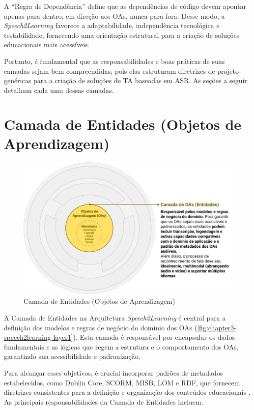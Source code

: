 A ``Regra de Dependência'' define que as dependências de código devem apontar apenas para dentro, em direção aos OAs, nunca para fora. Desse modo, a \textit{Speech2Learning} favorece a adaptabilidade, independência tecnológica e testabilidade, fornecendo uma orientação estrutural para a criação de soluções educacionais mais acessíveis. 

Portanto, é fundamental que as responsabilidades e boas práticas de suas camadas sejam bem compreendidas, pois elas estruturam diretrizes de projeto genéricas para a criação de soluções de TA baseadas em ASR. As seções a seguir detalham cada uma dessas camadas.

\section{Camada de Entidades (Objetos de Aprendizagem)}

\begin{figure}[htb]
\centering
\caption{Camada de Entidades (Objetos de Aprendizagem)}
\label{fig:chapter3-speech2learning-layer1}
\includegraphics[width=1\textwidth]{images/chapter3-speech2learning-layer1.png}
\end{figure}

A Camada de Entidades na Arquitetura \textit{Speech2Learning} é central para a definição dos modelos e regras de negócio do domínio dos OAs (\autoref{fig:chapter3-speech2learning-layer1}). Esta camada é responsável por encapsular os dados fundamentais e as lógicas que regem a estrutura e o comportamento dos OAs, garantindo sua acessibilidade e padronização. 

Para alcançar esses objetivos, é crucial incorporar padrões de metadados estabelecidos, como Dublin Core, SCORM, MISB, LOM e RDF, que fornecem diretrizes consistentes para a definição e organização dos conteúdos educacionais \cite{Santana2023}. As principais responsabilidades da Camada de Entidades incluem:

